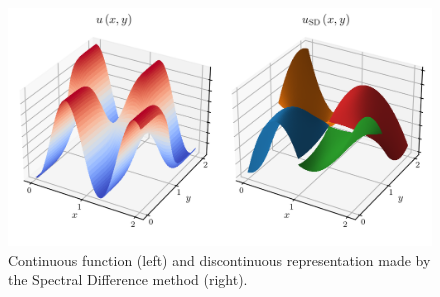       \begin{figure}
        \centering
        \includegraphics{figures/sd_discontinuous.png}
        \caption{Continuous function (left) and discontinuous representation made by the Spectral Difference method (right).}
        \label{fig:sd_discontinuous}
      \end{figure}

